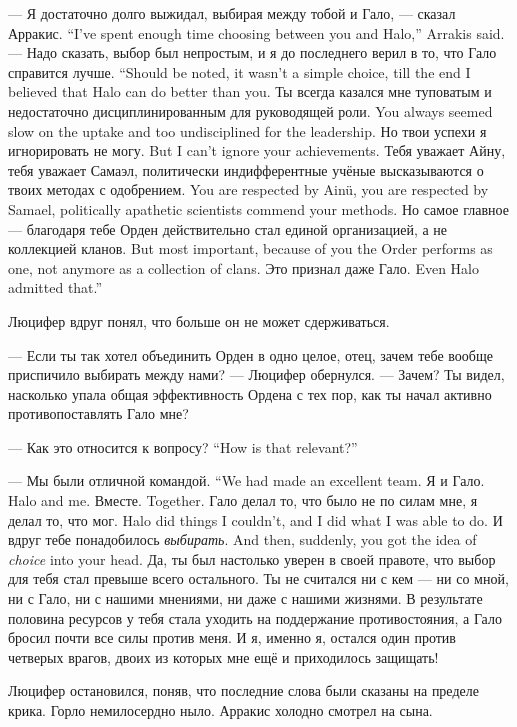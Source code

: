 {--- Я достаточно долго выжидал, выбирая между тобой и Гало, --- сказал Арракис.}
{``I've spent enough time choosing between you and Halo,'' Arrakis said.}
{--- Надо сказать, выбор был непростым, и я до последнего верил в то, что Гало справится лучше.}
{``Should be noted, it wasn't a simple choice, till the end I believed that Halo can do better than you.}
{Ты всегда казался мне туповатым и недостаточно дисциплинированным для руководящей роли.}
{You always seemed slow on the uptake and too undisciplined for the leadership.}
{Но твои успехи я игнорировать не могу.}
{But I can't ignore your achievements.}
{Тебя уважает Айну, тебя уважает Самаэл, политически индифферентные учёные высказываются о твоих методах с одобрением.}
{You are respected by Ain\"{u}, you are respected by Samael, politically apathetic scientists commend your methods.}
{Но самое главное --- благодаря тебе Орден действительно стал единой организацией, а не коллекцией кланов.}
{But most important, because of you the Order performs as one, not anymore as a collection of clans.}
{Это признал даже Гало.}
{Even Halo admitted that.''}

Люцифер вдруг понял, что больше он не может сдерживаться.

--- Если ты так хотел объединить Орден в одно целое, отец, зачем тебе вообще приспичило выбирать между нами? --- Люцифер обернулся.
--- Зачем?
Ты видел, насколько упала общая эффективность Ордена с тех пор, как ты начал активно противопоставлять Гало мне?

{--- Как это относится к вопросу?}
{``How is that relevant?''}

{--- Мы были отличной командой.}
{``We had made an excellent team.}
{Я и Гало.}
{Halo and me.}
{Вместе.}
{Together.}
{Гало делал то, что было не по силам мне, я делал то, что мог.}
{Halo did things I couldn't, and I did what I was able to do.}
{И вдруг тебе понадобилось \emph{выбирать}.}
{And then, suddenly, you got the idea of \emph{choice} into your head.}
Да, ты был настолько уверен в своей правоте, что выбор для тебя стал превыше всего остального.
Ты не считался ни с кем --- ни со мной, ни с Гало, ни с нашими мнениями, ни даже с нашими жизнями.
В результате половина ресурсов у тебя стала уходить на поддержание противостояния, а Гало бросил почти все силы против меня.
И я, именно я, остался один против четверых врагов, двоих из которых мне ещё и приходилось защищать!

Люцифер остановился, поняв, что последние слова были сказаны на пределе крика.
Горло немилосердно ныло.
Арракис холодно смотрел на сына.

